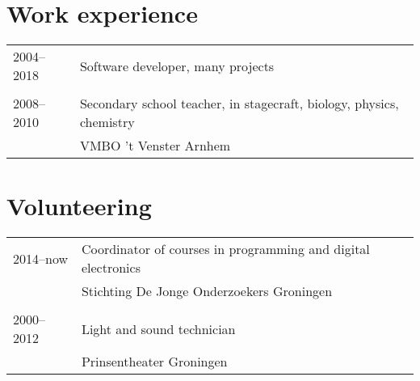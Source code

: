 \section*{Work experience}

\begin{tabular}{p{}l}
    2004--2018 & Software developer, many projects \\
    \\
    2008--2010 & Secondary school teacher, in stagecraft, biology, physics, chemistry \\
               & VMBO 't Venster Arnhem \\
\end{tabular}

\section*{Volunteering}

\begin{tabular}{p{}l}
    2014--now & Coordinator of courses in programming and digital electronics \\
              & Stichting De Jonge Onderzoekers Groningen \\
    \\
    2000--2012 & Light and sound technician \\
              & Prinsentheater Groningen \\
\end{tabular}
